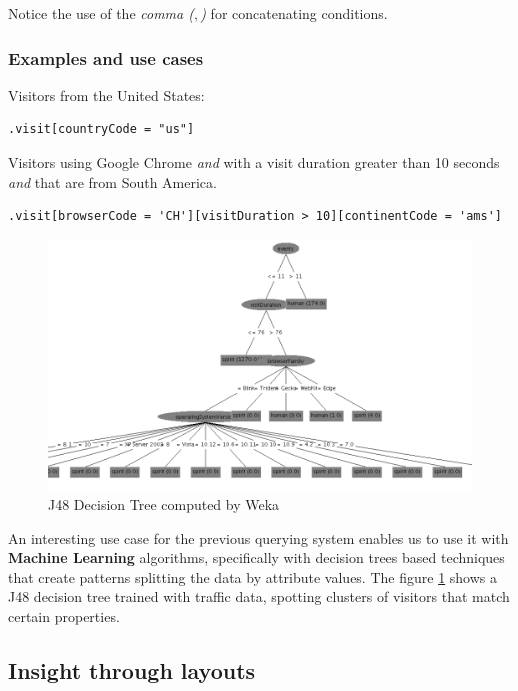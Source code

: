 \documentclass[preprint,12pt,3p]{elsarticle}
\begin{document}
Notice the use of the \textit{comma ($,$)} for concatenating conditions.

\subsubsection{Examples and use cases}
\label{sec:examples}
Visitors from the United States:
\begin{lstlisting}
.visit[countryCode = "us"]
\end{lstlisting}

Visitors using Google Chrome \textit{and} with a visit duration greater than 10 seconds \textit{and} that are from South America.
\begin{lstlisting}
.visit[browserCode = 'CH'][visitDuration > 10][continentCode = 'ams']
\end{lstlisting}

\begin{figure}[H]
	\centering
	\includegraphics[width = \textwidth]{screenshots/decision_tree}
	\caption{J48 Decision Tree computed by Weka}
	\label{fig:j48_decisionTree}
\end{figure}

An interesting use case for the previous querying system enables us to use it with \textbf{Machine Learning} algorithms, specifically with decision trees based techniques that create patterns splitting the data by attribute values. The figure \ref{fig:j48_decisionTree} shows a J48 decision tree \cite{drazin2012decision} trained with traffic data, spotting clusters of visitors that match certain properties.

\subsection{Insight through layouts}
\label{sec:layouts}
\end{document}

